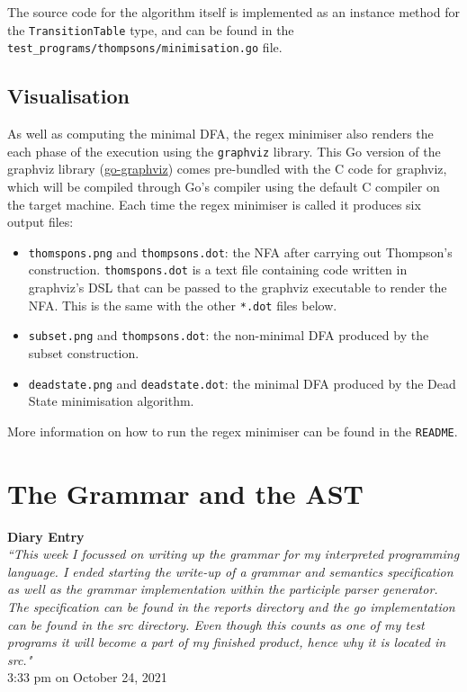 \documentclass[]{full}
\theoremstyle{definition}
\begin{document}
The source code for the algorithm itself is implemented as an instance method for the \verb|TransitionTable| type, and can be found in the \verb|test_programs/thompsons/minimisation.go| file.

\subsection{Visualisation}

As well as computing the minimal DFA, the regex minimiser also renders the each phase of the execution using the \verb|graphviz| library. This Go version of the graphviz library (\href{https://github.com/goccy/go-graphviz}{go-graphviz}) comes pre-bundled with the C code for graphviz, which will be compiled through Go's compiler using the default C compiler on the target machine. Each time the regex minimiser is called it produces six output files:

\begin{itemize}
    \item \verb|thomspons.png| and \verb|thompsons.dot|: the NFA after carrying out Thompson's construction. \verb|thomspons.dot| is a text file containing code written in graphviz's DSL that can be passed to the graphviz executable to render the NFA. This is the same with the other \verb|*.dot| files below.
    \item \verb|subset.png| and \verb|thompsons.dot|: the non-minimal DFA produced by the subset construction.
    \item \verb|deadstate.png| and \verb|deadstate.dot|: the minimal DFA produced by the Dead State minimisation algorithm.
\end{itemize}

More information on how to run the regex minimiser can be found in the \verb|README|.

\section{The Grammar and the AST}

\begin{center}
    \textbf{Diary Entry}\\[0.5em]
    \textit{``This week I focussed on writing up the grammar for my interpreted programming language. I ended starting the write-up of a grammar and semantics specification as well as the grammar implementation within the participle parser generator. The specification can be found in the reports directory and the go implementation can be found in the src directory. Even though this counts as one of my test programs it will become a part of my finished product, hence why it is located in src."}\\[0.5em]
    \tiny{3:33 pm on October 24, 2021}
\end{center}
\end{document}
